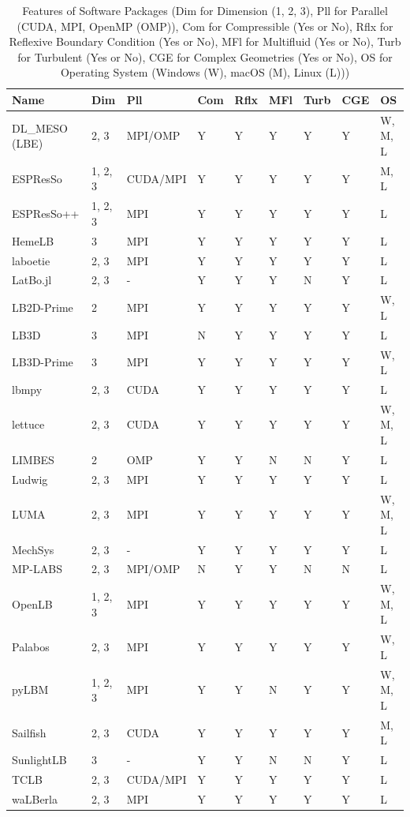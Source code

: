 \documentclass[final, 3p, times, authoryear]{elsarticle}
\begin{document}
\begin{table}
	\begin{center}
		\begin{tabular}{ p{3cm}llllllll}
			\hline
			Name & Dim & Pll & Com & Rflx & MFl & Turb & CGE & OS\\
			\hline
			DL\_MESO (LBE) & 2, 3 & MPI/OMP & Y & Y & Y & Y & Y & W, M, L\\
			ESPResSo & 1, 2, 3 & CUDA/MPI & Y & Y & Y & Y & Y & M, L\\
			ESPResSo++ & 1, 2, 3 & MPI & Y & Y & Y & Y & Y & L\\
			HemeLB & 3 & MPI & Y & Y & Y & Y & Y & L\\
			laboetie & 2, 3 & MPI & Y & Y & Y & Y & Y & L\\
			LatBo.jl & 2, 3 & - & Y & Y & Y & N & Y & L\\
			LB2D-Prime & 2 & MPI & Y & Y & Y & Y & Y & W, L\\
			LB3D & 3 & MPI & N & Y & Y & Y & Y & L\\
			LB3D-Prime & 3 & MPI & Y & Y & Y & Y & Y & W, L\\
			lbmpy & 2, 3 & CUDA & Y & Y & Y & Y & Y & L\\
			lettuce & 2, 3 & CUDA & Y & Y & Y & Y & Y & W, M, L\\
			LIMBES & 2 & OMP & Y & Y & N & N & Y & L\\
			Ludwig & 2, 3 & MPI & Y & Y & Y & Y & Y & L\\
			LUMA & 2, 3 & MPI & Y & Y & Y & Y & Y & W, M, L\\
			MechSys & 2, 3 & - & Y & Y & Y & Y & Y & L\\
			MP-LABS & 2, 3 & MPI/OMP & N & Y & Y & N & N & L\\
			OpenLB & 1, 2, 3 & MPI & Y & Y & Y & Y & Y & W, M, L\\
			Palabos & 2, 3 & MPI & Y & Y & Y & Y & Y & W, L\\
			pyLBM & 1, 2, 3 & MPI & Y & Y & N & Y & Y & W, M, L\\
			Sailfish & 2, 3 & CUDA & Y & Y & Y & Y & Y & M, L\\
			SunlightLB & 3 & - & Y & Y & N & N & Y & L\\
			TCLB & 2, 3 & CUDA/MPI & Y & Y & Y & Y & Y & L\\
			waLBerla & 2, 3 & MPI & Y & Y & Y & Y & Y & L\\
			\hline
		\end{tabular}
		\caption{Features of Software Packages (Dim for Dimension (1, 2, 3),
			Pll for Parallel (CUDA, MPI, OpenMP (OMP)), Com for Compressible (Yes or No), Rflx for
			Reflexive Boundary Condition (Yes or No), MFl for Multifluid (Yes or
			No), Turb for Turbulent (Yes or No), CGE for Complex Geometries (Yes or No), OS for Operating System (Windows (W), macOS (M), Linux (L)))} \label{tbl_features}
	\end{center}
\end{table}
\end{document}
